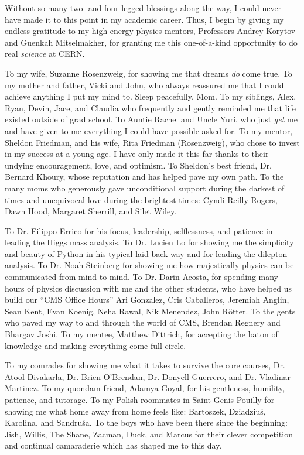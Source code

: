 Without so many two- and four-legged blessings along the way, I could never have made it to this point in my academic career.
Thus, I begin by giving my endless gratitude to my high energy physics mentors, Professors Andrey Korytov and Guenkah Mitselmakher, for granting me this one-of-a-kind opportunity to do real \emph{science} at CERN.

To my wife, Suzanne Rosenzweig, for showing me that dreams \emph{do} come true.
To my mother and father, Vicki and John, who always reassured me that I could achieve anything I put my mind to. Sleep peacefully, Mom.
To my siblings, Alex, Ryan, Devin, Jace, and Claudia who frequently and gently reminded me that life existed outside of grad school.
To Auntie Rachel and Uncle Yuri, who just \emph{get} me and have given to me everything I could have possible asked for. %
To my mentor, Sheldon Friedman, and his wife, Rita Friedman (Rosenzweig), who chose to invest in my success at a young age.
I have only made it this far thanks to their undying encouragement, love, and optimism.
To Sheldon's best friend, Dr. Bernard Khoury, whose reputation and has helped pave my own path.
To the many moms who generously gave unconditional support during the darkest of times and unequivocal love during the brightest times:
Cyndi Reilly-Rogers, Dawn Hood, Margaret Sherrill, and Silet Wiley.

To Dr. Filippo Errico for his focus, leadership, selflessness, and patience in leading the Higgs mass analysis.
To Dr. Lucien Lo for showing me the simplicity and beauty of Python in his typical laid-back way and for leading the dilepton analysis. %
To Dr. Noah Steinberg for showing me how majestically physics can be communicated from mind to mind.
To Dr. Darin Acosta, for spending many hours of physics discussion with me and the other students, who have helped us build our ``CMS Office Hours''
Ari Gonzalez, Cris Caballeros, Jeremiah Anglin, Sean Kent, 
Evan Koenig, Neha Rawal, Nik Menendez, John Rötter.  %
To the gents who paved my way to and through the world of CMS, Brendan Regnery and Bhargav Joshi.
To my mentee, Matthew Dittrich, for accepting the baton of knowledge and making everything come full circle.

To my comrades for showing me what it takes to survive the core courses, Dr. Atool Divakarla, Dr. Brien O'Brendan, Dr. Donyell Guerrero, and Dr. Vladinar Martinez.
To my quondam friend, Adamya Goyal, for his gentleness, humility, patience, and tutorage.
To my Polish roommates in Saint-Genis-Pouilly for showing me what home away from home feels like: Bartoszek, Dziadziuś, Karolina, and Sandruśa.
To the boys who have been there since the beginning: Jish, Willis, The Shane, Zacman, Duck, and Marcus for their clever competition and continual camaraderie which has shaped me to this day.

